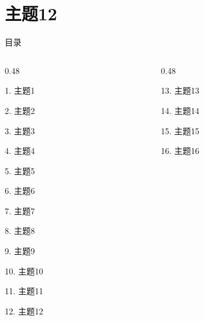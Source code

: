 \documentclass[aspectratio=169,10pt,fontset=fandol]{ctexbeamer}
\begin{document}
\section{主题12}
\begin{frame}[t,fragile]{目录}
\small
\begin{columns}[T,onlytextwidth]
\begin{column}{0.48\textwidth}
{\color{black}\small 1. 主题1\par}\vspace{0.22em}
{\color{black}\small 2. 主题2\par}\vspace{0.22em}
{\color{black}\small 3. 主题3\par}\vspace{0.22em}
{\color{black}\small 4. 主题4\par}\vspace{0.22em}
{\color{black}\small 5. 主题5\par}\vspace{0.22em}
{\color{black}\small 6. 主题6\par}\vspace{0.22em}
{\color{black}\small 7. 主题7\par}\vspace{0.22em}
{\color{black}\small 8. 主题8\par}\vspace{0.22em}
{\color{black}\small 9. 主题9\par}\vspace{0.22em}
{\color{black}\small 10. 主题10\par}\vspace{0.22em}
{\color{black}\small 11. 主题11\par}\vspace{0.22em}
{\color{blue}\small 12. 主题12\par}\vspace{0.22em}
\end{column}
\begin{column}{0.48\textwidth}
{\color{gray!40}\small 13. 主题13\par}\vspace{0.22em}
{\color{gray!40}\small 14. 主题14\par}\vspace{0.22em}
{\color{gray!40}\small 15. 主题15\par}\vspace{0.22em}
{\color{gray!40}\small 16. 主题16\par}\vspace{0.22em}

\end{column}
\end{columns}
\end{frame}
\end{document}
